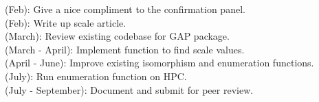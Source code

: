 \documentclass[preview]{standalone}
\begin{document}
(Feb): Give a nice compliment to the confirmation panel.\\(Feb): Write up scale article.\\(March): Review existing codebase for GAP package.\\(March - April): Implement function to find scale values.\\(April - June): Improve existing isomorphism and enumeration functions.\\(July): Run enumeration function on HPC.\\(July - September): Document and submit for peer review.\\
\end{document}
